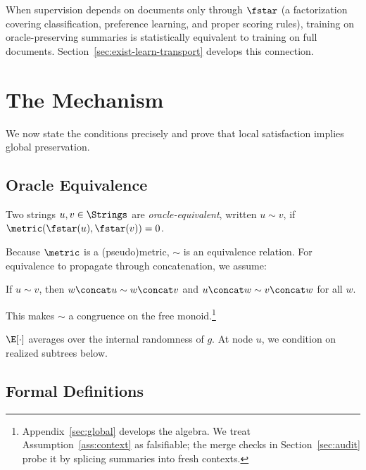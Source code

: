 When supervision depends on documents only through $\fstar$ (a factorization covering classification, preference learning, and proper scoring rules), training on oracle-preserving summaries is statistically equivalent to training on full documents. Section~\ref{sec:exist-learn-transport} develops this connection.


\section{The Mechanism}\label{sec:mechanism}

We now state the conditions precisely and prove that local satisfaction implies global preservation.

\subsection{Oracle Equivalence}

\begin{definition}\label{def:oracle-equiv}
Two strings $u, v \in \Strings$ are \emph{oracle-equivalent}, written $u \sim v$, if $\metric(\fstar(u), \fstar(v)) = 0$.
\end{definition}

Because $\metric$ is a (pseudo)metric, $\sim$ is an equivalence relation. For equivalence to propagate through concatenation, we assume:

\begin{assumption}\label{ass:context}
If $u \sim v$, then $w \concat u \sim w \concat v$ and $u \concat w \sim v \concat w$ for all $w$.
\end{assumption}

This makes $\sim$ a congruence on the free monoid.\footnote{Appendix~\ref{sec:global} develops the algebra. We treat Assumption~\ref{ass:context} as falsifiable; the merge checks in Section~\ref{sec:audit} probe it by splicing summaries into fresh contexts.}

\begin{convention}[Expectation]\label{conv:expectation}
$\E[\cdot]$ averages over the internal randomness of $g$. At node $u$, we condition on realized subtrees below.
\end{convention}

\subsection{Formal Definitions}

